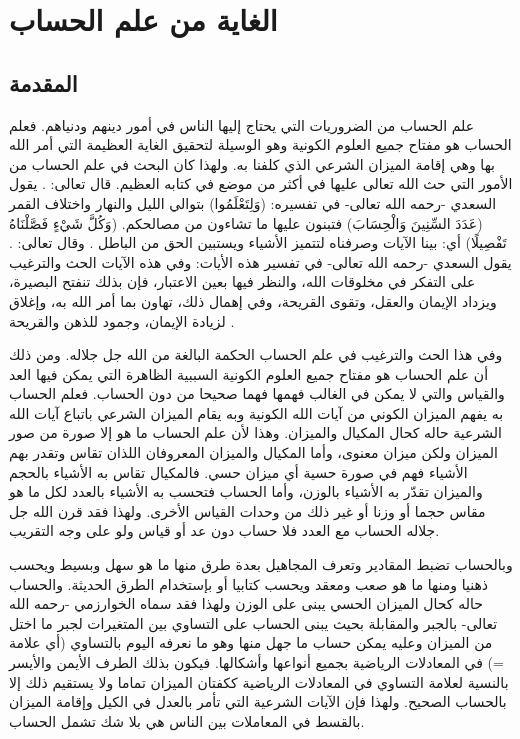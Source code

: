 \chapter{الغاية من علم الحساب}

\section{المقدمة}

علم الحساب من الضروريات التي يحتاج إليها الناس في أمور دينهم ودنياهم. فعلم الحساب هو مفتاح جميع العلوم الكونية وهو الوسيلة لتحقيق الغاية العظيمة التي أمر الله بها وهي إقامة الميزان الشرعي الذي كلفنا به. ولهذا كان البحث في علم الحساب من الأمور التي حث الله تعالى عليها في أكثر من موضع في كتابه العظيم. قال تعالى: \quranayah*[17][12]{\footnotesize \surahname*[17]}. يقول السعدي -رحمه الله تعالى- في تفسيره: (وَلِتَعْلَمُوا) بتوالي الليل والنهار واختلاف القمر (عَدَدَ السِّنِينَ وَالْحِسَابَ) فتبنون عليها ما تشاءون من مصالحكم. (وَكُلَّ شَيْءٍ فَصَّلْنَاهُ تَفْصِيلًا) أي: بينا الآيات وصرفناه لتتميز الأشياء ويستبين الحق من الباطل \href{https://shamela.ws/book/42/1001#p1}{\faExternalLink} \cite{tafsir_Saadi}. وقال تعالى: \quranayah*[10][5]{\footnotesize \surahname*[10]}. يقول السعدي -رحمه الله تعالى- في تفسير هذه الأيات: وفي هذه الآيات الحث والترغيب على التفكر في مخلوقات الله، والنظر فيها بعين الاعتبار، فإن بذلك تنفتح البصيرة، ويزداد الإيمان والعقل، وتقوى القريحة، وفي إهمال ذلك، تهاون بما أمر الله به، وإغلاق لزيادة الإيمان، وجمود للذهن والقريحة \href{https://shamela.ws/book/42/729#p6}{\faExternalLink} \cite{tafsir_Saadi}.

وفي هذا الحث والترغيب في علم الحساب الحكمة البالغة من الله جل جلاله. ومن ذلك أن علم الحساب هو مفتاح جميع العلوم الكونية السببية الظاهرة التي يمكن فيها العد والقياس والتي لا يمكن في الغالب فهمها فهما صحيحا من دون الحساب. فعلم الحساب به يفهم الميزان الكوني من آيات الله الكونية وبه يقام الميزان الشرعي باتباع آيات الله الشرعية حاله كحال المكيال والميزان. وهذا لأن علم الحساب ما هو إلا صورة من صور الميزان ولكن ميزان معنوى، وأما المكيال والميزان المعروفان اللذان تقاس وتقدر بهم الأشياء فهم في صورة حسية أي ميزان حسي. فالمكيال تقاس به الأشياء بالحجم والميزان تقدّر به الأشياء بالوزن، وأما الحساب فتحسب به الأشياء بالعدد لكل ما هو مقاس حجما أو وزنا أو غير ذلك من وحدات القياس الأخرى. ولهذا فقد قرن الله جل جلاله الحساب مع العدد فلا حساب دون عد أو قياس ولو على وجه التقريب. 

وبالحساب تضبط المقادير وتعرف المجاهيل بعدة طرق منها ما هو سهل وبسيط ويحسب ذهنيا ومنها ما هو صعب ومعقد ويحسب كتابيا أو بإستخدام الطرق الحديثة. والحساب حاله كحال الميزان الحسي يبنى على الوزن ولهذا فقد سماه الخوارزمي -رحمه الله تعالى- بالجبر والمقابلة بحيث يبنى الحساب على التساوي بين المتغيرات لجبر ما اختل من الميزان وعليه يمكن حساب ما جهل منها وهو ما نعرفه اليوم بالتساوي (أي علامة =) في المعادلات الرياضية بجميع أنواعها وأشكالها. فيكون بذلك الطرف الأيمن والأيسر بالنسية لعلامة التساوي في المعادلات الرياضية ككفتان الميزان تماما ولا يستقيم ذلك إلا بالحساب الصحيح. ولهذا فإن الآيات الشرعية التي تأمر بالعدل في الكيل وإقامة الميزان بالقسط في المعاملات بين الناس هي بلا شك تشمل الحساب.

